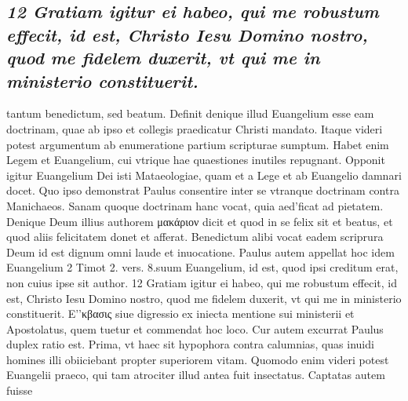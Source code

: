 \documentclass{article}
\begin{document}
\begin{pages}
\subsection*{\textit{12 Gratiam igitur ei habeo, qui me robustum effecit, id est, Christo Iesu Domino nostro, quod me fidelem duxerit, vt qui me in ministerio constituerit.}}tantum benedictum, sed beatum. Definit denique illud Euangelium esse eam doctrinam, quae ab ipso et collegis praedicatur Christi mandato. Itaque videri potest argumentum ab enumeratione partium scripturae sumptum. Habet enim Legem et Euangelium, cui vtrique hae quaestiones inutiles repugnant. Opponit igitur Euangelium Dei isti Mataeologiae, quam et a Lege et ab Euangelio damnari docet. Quo ipso demonstrat Paulus consentire inter se vtranque doctrinam contra Manichaeos. Sanam quoque doctrinam hanc vocat, quia aed’ficat ad pietatem. Denique Deum illius authorem μακάριον dicit et quod in se felix sit et beatus, et quod aliis felicitatem donet et afferat. Benedictum alibi vocat eadem scriprura Deum id est dignum omni laude et inuocatione. Paulus autem appellat hoc idem Euangelium 2 Timot 2. vers. 8.suum Euangelium, id est, quod ipsi creditum erat, non cuius ipse sit author. 12 Gratiam igitur ei habeo, qui me robustum effecit, id est, Christo Iesu Domino nostro, quod me fidelem duxerit, vt qui me in ministerio constituerit. E’'κβασις siue digressio ex iniecta mentione sui ministerii et Apostolatus, quem tuetur et commendat hoc loco. Cur autem excurrat Paulus duplex ratio est. Prima, vt haec sit hypophora contra calumnias, quas inuidi homines illi obiiciebant propter superiorem vitam. Quomodo enim videri potest Euangelii praeco, qui tam atrociter illud antea fuit insectatus. Captatas autem fuisse  \pend

\end{pages}
\end{document}
